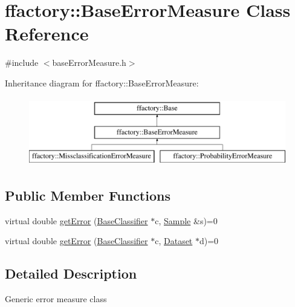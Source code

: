 \hypertarget{classffactory_1_1_base_error_measure}{\section{ffactory\-:\-:Base\-Error\-Measure Class Reference}
\label{classffactory_1_1_base_error_measure}
}


{\ttfamily \#include $<$base\-Error\-Measure.\-h$>$}

Inheritance diagram for ffactory\-:\-:Base\-Error\-Measure\-:\begin{figure}[H]
\begin{center}
\leavevmode
\includegraphics[height=3.000000cm]{classffactory_1_1_base_error_measure}
\end{center}
\end{figure}
\subsection*{Public Member Functions}
\begin{DoxyCompactItemize}
\item 
virtual double \hyperlink{classffactory_1_1_base_error_measure_a8eb4fef1cb479834c3fc1baac589d8b1}{get\-Error} (\hyperlink{classffactory_1_1_base_classifier}{Base\-Classifier} $\ast$c, \hyperlink{classffactory_1_1_sample}{Sample} \&s)=0
\item 
virtual double \hyperlink{classffactory_1_1_base_error_measure_a59333613908d58b1a5ff7208bd93d6fb}{get\-Error} (\hyperlink{classffactory_1_1_base_classifier}{Base\-Classifier} $\ast$c, \hyperlink{classffactory_1_1_dataset}{Dataset} $\ast$d)=0
\end{DoxyCompactItemize}


\subsection{Detailed Description}
Generic error measure class 

